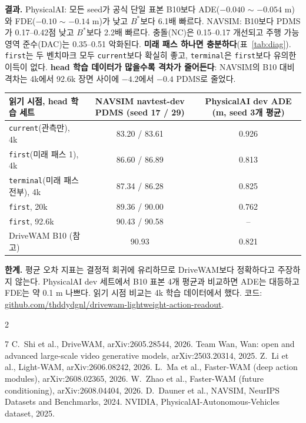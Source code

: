 \documentclass[nouppercase]{kaia}
\makeatletter
\newenvironment{posterrefs}{\par\vspace{2pt}\noindent{\small\textbf{References}}\par
  \def\@openbib@code{\scriptsize\setlength{\itemsep}{0pt}\setlength{\parsep}{0pt}\setlength{\topsep}{0pt}}%
  \let\section\@gobbletwo
  \setlength{\multicolsep}{0pt}\vspace{-0.8\baselineskip}%
  \begin{multicols}{2}\begin{thebibliography}{7}}{\end{thebibliography}\end{multicols}}
\makeatother
\begin{document}
\begin{mdframed}
\textbf{결과.} PhysicalAI: 모든 seed가 공식 단일 표본 B10보다 ADE($-0.040$ $\sim$ $-0.054$ m)와 FDE($-0.10$ $\sim$ $-0.14$ m)가 낮고 $B^{*}$보다 6.1배 빠르다. NAVSIM: B10보다 PDMS가 0.17--0.42점 낮고 $B^{*}$보다 2.2배 빠르다. 충돌(NC)은 0.15--0.17 개선되고 주행 가능 영역 준수(DAC)는 0.35--0.51 악화된다.
\textbf{미래 패스 하나면 충분하다}(표~\ref{tab:diag}). \texttt{first}는 두 벤치마크 모두 \texttt{current}보다 확실히 좋고, \texttt{terminal}은 \texttt{first}보다 유의한 이득이 없다. \textbf{head 학습 데이터가 많을수록 격차가 줄어든다}: NAVSIM의 B10 대비 격차는 4k에서 92.6k 장면 사이에 $-4.2$에서 $-0.4$ PDMS로 줄었다.
\begin{center}
\footnotesize
\setlength{\tabcolsep}{6pt}
\begin{tabular}{lcc}
\toprule
읽기 시점, head 학습 세트 & NAVSIM navtest-dev PDMS (seed 17 / 29) & PhysicalAI dev ADE (m, seed 3개 평균) \\
\midrule
\texttt{current}(관측만), 4k & 83.20 / 83.61 & 0.926 \\
\texttt{first}(미래 패스 1), 4k & 86.60 / 86.89 & 0.813 \\
\texttt{terminal}(미래 패스 전부), 4k & 87.34 / 86.28 & 0.825 \\
\texttt{first}, 20k & 89.36 / 90.00 & 0.762 \\
\texttt{first}, 92.6k & 90.43 / 90.58 & -- \\
DriveWAM B10 (참고) & 90.93 & 0.821 \\
\bottomrule
\end{tabular}
\label{tab:diag}
\end{center}

\textbf{한계.} 평균 오차 지표는 결정적 회귀에 유리하므로 DriveWAM보다 정확하다고 주장하지 않는다. PhysicalAI dev 세트에서 B10 표본 4개 평균과 비교하면 ADE는 대등하고 FDE는 약 0.1 m 나쁘다. 읽기 시점 비교는 4k 학습 데이터에서 했다. 코드: \url{github.com/thddydgnl/drivewam-lightweight-action-readout}.

\begin{posterrefs}
 C.~Shi et al., DriveWAM, arXiv:2605.28544, 2026.
 Team Wan, Wan: open and advanced large-scale video generative models, arXiv:2503.20314, 2025.
 Z.~Li et al., Light-WAM, arXiv:2606.08242, 2026.
 L.~Ma et al., Faster-WAM (deep action modules), arXiv:2608.02365, 2026.
 W.~Zhao et al., Faster-WAM (future conditioning), arXiv:2608.04404, 2026.
 D.~Dauner et al., NAVSIM, NeurIPS Datasets and Benchmarks, 2024.
 NVIDIA, PhysicalAI-Autonomous-Vehicles dataset, 2025.
\end{posterrefs}

\end{mdframed}
\end{document}
